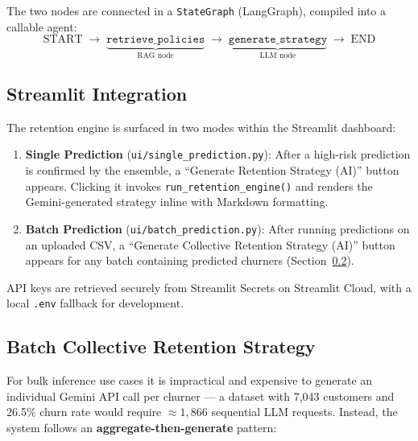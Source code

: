 \documentclass[12pt,a4paper]{article}
\begin{document}
The two nodes are connected in a \texttt{StateGraph} (LangGraph), compiled into a callable agent:
\[
\text{START} \;\rightarrow\; \underbrace{\texttt{retrieve\_policies}}_\text{RAG node} \;\rightarrow\; \underbrace{\texttt{generate\_strategy}}_\text{LLM node} \;\rightarrow\; \text{END}
\]

\subsection{Streamlit Integration}

The retention engine is surfaced in two modes within the Streamlit dashboard:

\begin{enumerate}[leftmargin=2em]
    \item \textbf{Single Prediction} (\texttt{ui/single\_prediction.py}): After a high-risk prediction is confirmed by the ensemble, a ``Generate Retention Strategy (AI)'' button appears. Clicking it invokes \texttt{run\_retention\_engine()} and renders the Gemini-generated strategy inline with Markdown formatting.
    \item \textbf{Batch Prediction} (\texttt{ui/batch\_prediction.py}): After running predictions on an uploaded CSV, a ``Generate Collective Retention Strategy (AI)'' button appears for any batch containing predicted churners (Section~\ref{sec:batch-retention}).
\end{enumerate}

API keys are retrieved securely from Streamlit Secrets on Streamlit Cloud, with a local \texttt{.env} fallback for development.

\subsection{Batch Collective Retention Strategy}
\label{sec:batch-retention}

For bulk inference use cases it is impractical and expensive to generate an individual Gemini API call per churner --- a dataset with 7,043 customers and 26.5\% churn rate would require $\approx 1{,}866$ sequential LLM requests. Instead, the system follows an \textbf{aggregate-then-generate} pattern:
\end{document}
